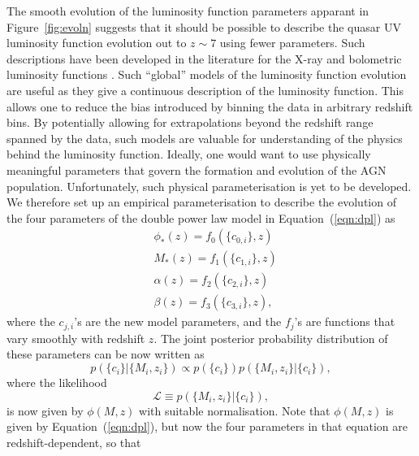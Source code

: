\documentclass[fleqn,usenatbib]{mnras}
\begin{document}
      The smooth evolution of the luminosity function parameters apparant in
      Figure~\ref{fig:evoln} suggests that it should be possible to describe
      the quasar UV luminosity function evolution out to $z\sim 7$ using
      fewer parameters.  Such descriptions have been developed in the
      literature for the X-ray \citep[e.g.,][]{2015MNRAS.451.1892A} and
      bolometric luminosity functions \citep[e.g.,][]{2007ApJ...654..731H}.
      Such ``global'' models of the luminosity function evolution are useful
      as they give a continuous description of the luminosity function.
      This allows one to reduce the bias introduced by binning the data in
      arbitrary redshift bins.  By potentially allowing for extrapolations
      beyond the redshift range spanned by the data, such models are
      valuable for understanding of the physics behind the luminosity
      function.  Ideally, one would want to use physically meaningful
      parameters that govern the formation and evolution of the AGN
      population.  Unfortunately, such physical parameterisation is yet to
      be developed.  We therefore set up an empirical parameterisation to
      describe the evolution of the four parameters of the double power law
      model in Equation~(\ref{eqn:dpl}) as
      \begin{align}
        &\phi_*(z) = f_0(\{c_{0,i}\}, z)\nonumber\\
        &M_*(z) = f_1(\{c_{1,i}\}, z)\nonumber\\
        &\alpha(z) = f_2(\{c_{2,i}\}, z)\nonumber\\
        &\beta(z) = f_3(\{c_{3,i}\}, z),
        \label{eqn:global}
      \end{align}
      where the $c_{j,i}$'s are the new model parameters, and the $f_j$'s
      are functions that vary smoothly with redshift $z$.  The joint
      posterior probability distribution of these parameters can be now
      written as
      \begin{equation}
        p(\{c_i\} | \{M_i, z_i\}) \propto p(\{c_i\})p(\{M_i, z_i\} | \{c_i\}),
      \end{equation}
      where the likelihood 
      \begin{equation}
        \mathcal{L}\equiv p(\{M_i, z_i\} | \{c_i\}),
      \end{equation}
      is now given by $\phi(M,z)$ with suitable normalisation.  Note that
      $\phi(M,z)$ is given by Equation~(\ref{eqn:dpl}), but now the four
      parameters in that equation are redshift-dependent, so that
\end{document}
